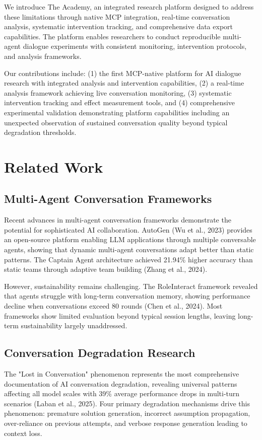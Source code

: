 \documentclass[11pt,letterpaper]{article}
\newcommand{\theacademy}{The Academy}
\newcommand{\mcp}{MCP}
\begin{document}
We introduce \theacademy{}, an integrated research platform designed to address these limitations through native \mcp{} integration, real-time conversation analysis, systematic intervention tracking, and comprehensive data export capabilities. The platform enables researchers to conduct reproducible multi-agent dialogue experiments with consistent monitoring, intervention protocols, and analysis frameworks.

Our contributions include: (1) the first \mcp{}-native platform for AI dialogue research with integrated analysis and intervention capabilities, (2) a real-time analysis framework achieving live conversation monitoring, (3) systematic intervention tracking and effect measurement tools, and (4) comprehensive experimental validation demonstrating platform capabilities including an unexpected observation of sustained conversation quality beyond typical degradation thresholds.

\section{Related Work}

\subsection{Multi-Agent Conversation Frameworks}

Recent advances in multi-agent conversation frameworks demonstrate the potential for sophisticated AI collaboration. AutoGen (Wu et al., 2023) provides an open-source platform enabling LLM applications through multiple conversable agents, showing that dynamic multi-agent conversations adapt better than static patterns. The Captain Agent architecture achieved 21.94\% higher accuracy than static teams through adaptive team building (Zhang et al., 2024).

However, sustainability remains challenging. The RoleInteract framework revealed that agents struggle with long-term conversation memory, showing performance decline when conversations exceed 80 rounds (Chen et al., 2024). Most frameworks show limited evaluation beyond typical session lengths, leaving long-term sustainability largely unaddressed.

\subsection{Conversation Degradation Research}

The "Lost in Conversation" phenomenon represents the most comprehensive documentation of AI conversation degradation, revealing universal patterns affecting all model scales with 39\% average performance drops in multi-turn scenarios (Laban et al., 2025). Four primary degradation mechanisms drive this phenomenon: premature solution generation, incorrect assumption propagation, over-reliance on previous attempts, and verbose response generation leading to context loss.
\end{document}

